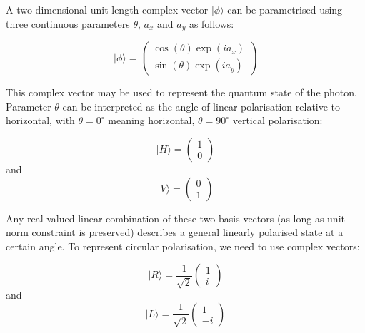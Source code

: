 A two-dimensional unit-length complex vector $\vert \phi \rangle$ can be parametrised using three continuous parameters $\theta$, $a_x$ and $a_y$ as follows:

\begin{equation}
	\vert \phi \rangle = \left(\begin{array}{c}
		\cos(\theta)\exp(ia_x)\\
		\sin(\theta)\exp(ia_y)\end{array}\right)
\end{equation}

This complex vector may be used to represent the quantum state of the photon. Parameter $\theta$ can be interpreted as the angle of linear polarisation relative to horizontal, with $\theta = 0^{\circ}$ meaning horizontal, $\theta=90^{\circ}$ vertical polarisation:

\begin{equation}
	\vert H \rangle = \left(\begin{array}{c}
		1\\
		0\end{array}\right)
	\label{eqn:quantum_photon_horizontal}
\end{equation}
and
\begin{equation}
	\vert V \rangle = \left(\begin{array}{c}
		0\\
		1\end{array}\right)
	\label{eqn:quantum_photon_vertical}
\end{equation}

Any real valued linear combination of these two basis vectors (as long as unit-norm constraint is preserved) describes a general linearly polarised state at a certain angle. To represent circular polarisation, we need to use complex vectors:

\begin{equation}
	\vert R \rangle = \frac{1}{\sqrt{2}}\left(\begin{array}{c}
		1\\
		i\end{array}\right)
	\label{eqn:quantum_photon_right}
\end{equation}
and
\begin{equation}
	\vert L \rangle = \frac{1}{\sqrt{2}}\left(\begin{array}{c}
		1\\
		-i\end{array}\right)
	\label{eqn:quantum_photon_left}
\end{equation}

